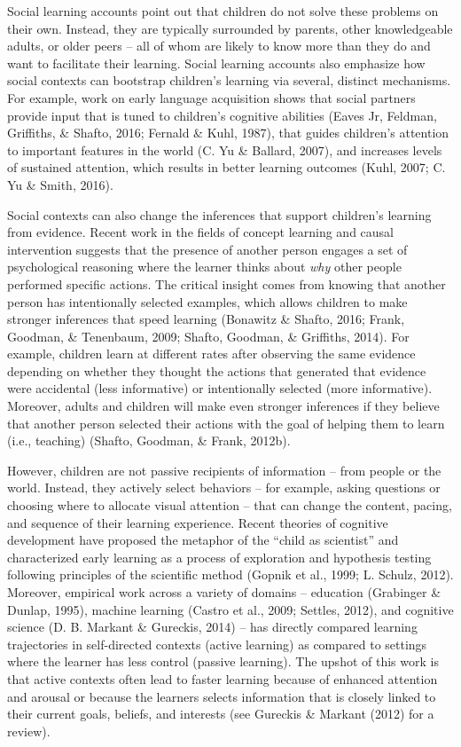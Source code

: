 \documentclass[oneside]{report}
\begin{document}
Social learning accounts point out that children do not solve these
problems on their own. Instead, they are typically surrounded by
parents, other knowledgeable adults, or older peers -- all of whom are
likely to know more than they do and want to facilitate their learning.
Social learning accounts also emphasize how social contexts can
bootstrap children's learning via several, distinct mechanisms. For
example, work on early language acquisition shows that social partners
provide input that is tuned to children's cognitive abilities (Eaves Jr,
Feldman, Griffiths, \& Shafto, 2016; Fernald \& Kuhl, 1987), that guides
children's attention to important features in the world (C. Yu \&
Ballard, 2007), and increases levels of sustained attention, which
results in better learning outcomes (Kuhl, 2007; C. Yu \& Smith, 2016).

Social contexts can also change the inferences that support children's
learning from evidence. Recent work in the fields of concept learning
and causal intervention suggests that the presence of another person
engages a set of psychological reasoning where the learner thinks about
\emph{why} other people performed specific actions. The critical insight
comes from knowing that another person has intentionally selected
examples, which allows children to make stronger inferences that speed
learning (Bonawitz \& Shafto, 2016; Frank, Goodman, \& Tenenbaum, 2009;
Shafto, Goodman, \& Griffiths, 2014). For example, children learn at
different rates after observing the same evidence depending on whether
they thought the actions that generated that evidence were accidental
(less informative) or intentionally selected (more informative).
Moreover, adults and children will make even stronger inferences if they
believe that another person selected their actions with the goal of
helping them to learn (i.e., teaching) (Shafto, Goodman, \& Frank,
2012b).

However, children are not passive recipients of information -- from
people or the world. Instead, they actively select behaviors -- for
example, asking questions or choosing where to allocate visual attention
-- that can change the content, pacing, and sequence of their learning
experience. Recent theories of cognitive development have proposed the
metaphor of the ``child as scientist'' and characterized early learning
as a process of exploration and hypothesis testing following principles
of the scientific method (Gopnik et al., 1999; L. Schulz, 2012).
Moreover, empirical work across a variety of domains -- education
(Grabinger \& Dunlap, 1995), machine learning (Castro et al., 2009;
Settles, 2012), and cognitive science (D. B. Markant \& Gureckis, 2014)
-- has directly compared learning trajectories in self-directed contexts
(active learning) as compared to settings where the learner has less
control (passive learning). The upshot of this work is that active
contexts often lead to faster learning because of enhanced attention and
arousal or because the learners selects information that is closely
linked to their current goals, beliefs, and interests (see Gureckis \&
Markant (2012) for a review).
\end{document}
